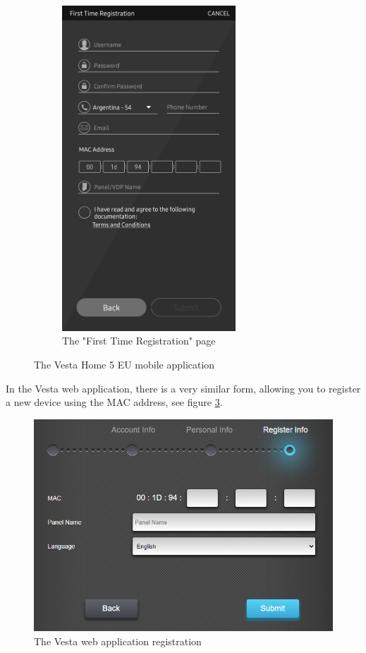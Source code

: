 \begin{figure}[!ht]
\begin{subfigure}[t]{0.5\textwidth}
        \includegraphics[height=4.8in]{images/6-pentesting/vesta-home-registration.jpg}
        \caption{The "First Time Registration" page}
        \label{fig:vesta-registration-page}
    \end{subfigure}
    \caption{The Vesta Home 5 EU mobile application}
    \label{fig:vesta-home-app}
\end{figure}
In the Vesta web application, there is a very similar form, allowing you to register a new device using the MAC address, see figure \ref{fig:vesta-web-registration}.
\begin{figure}[!ht]
    \centering
    \includegraphics[width=\textwidth]{images/6-pentesting/vesta-web-registration.png}
    \caption{The Vesta web application registration}
    \label{fig:vesta-web-registration}
\end{figure}

